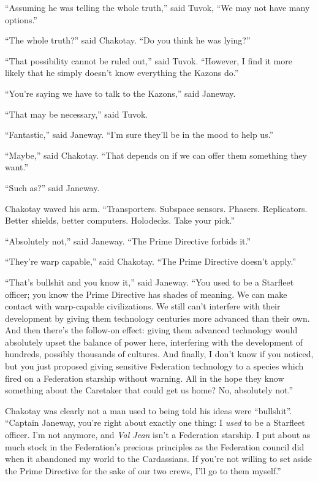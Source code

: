 \documentclass[twoside,letterpaper,12pt]{memoir}
\begin{document}
``Assuming he was telling the whole truth,'' said Tuvok, ``We may not have many options.''

``The whole truth?'' said Chakotay. ``Do you think he was lying?''

``That possibility cannot be ruled out,'' said Tuvok. ``However, I find it more likely that he simply doesn't know everything the Kazons do.''

``You're saying we have to talk to the Kazons,'' said Janeway.

``That may be necessary,'' said Tuvok.

``Fantastic,'' said Janeway. ``I'm sure they'll be in the mood to help us.''

``Maybe,'' said Chakotay. ``That depends on if we can offer them something they want.''

``Such as?'' said Janeway.

Chakotay waved his arm. ``Transporters. Subspace sensors. Phasers. Replicators. Better shields, better computers. Holodecks. Take your pick.''

``Absolutely not,'' said Janeway. ``The Prime Directive forbids it.''

``They're warp capable,'' said Chakotay. ``The Prime Directive doesn't apply.''

``That's bullshit and you know it,'' said Janeway. ``You used to be a Starfleet officer; you know the Prime Directive has shades of meaning. We can make contact with warp-capable civilizations. We still can't interfere with their development by giving them technology centuries more advanced than their own. And then there's the follow-on effect: giving them advanced technology would absolutely upset the balance of power here, interfering with the development of hundreds, possibly thousands of cultures. And finally, I don't know if you noticed, but you just proposed giving sensitive Federation technology to a species which fired on a Federation starship without warning. All in the hope they know something about the Caretaker that could get us home? No, absolutely not.''

Chakotay was clearly not a man used to being told his ideas were ``bullshit''. ``Captain Janeway, you're right about exactly one thing: I \textit{used} to be a Starfleet officer. I'm not anymore, and \textit{Val Jean} isn't a Federation starship. I put about as much stock in the Federation's precious principles as the Federation council did when it abandoned my world to the Cardassians. If you're not willing to set aside the Prime Directive for the sake of our two crews, I'll go to them myself.''
\end{document}
